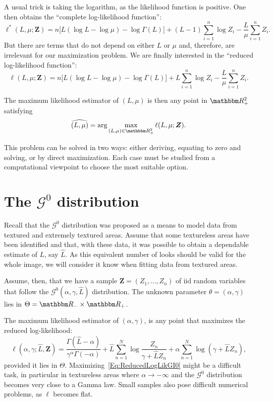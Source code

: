 A usual trick is taking the logarithm, as the likelihood function is positive.
One then obtains the ``complete log-likelihood function'':
\begin{equation}
\ell^*(L,\mu;\bm Z)=n\big[L(\log L - \log\mu) - \log\Gamma(L)
\big] + (L-1)\sum_{i=1}^n \log Z_i - \frac{L}{\mu} \sum_{i=1}^n Z_i.
\end{equation}
But there are terms that do not depend on either $L$ or $\mu$ and, therefore, are irrelevant for our maximization problem.
We are finally interested in the ``reduced log-likelihood function'':
\begin{equation}
\ell(L,\mu;\bm Z)=n\big[L(\log L - \log\mu) - \log\Gamma(L)
\big] + L\sum_{i=1}^n \log Z_i - \frac{L}{\mu} \sum_{i=1}^n Z_i.
\label{eq:RedLogLikGammaSAR}
\end{equation}

The maximum likelihood estimator of $(L,\mu)$ is then any point in $\mathbbm R_+^2$ satisfying
\begin{equation}
\widehat{(L,\mu)} = \arg\max_{(L,\mu)\in\mathbbm R_+^2} \ell(L,\mu;\bm Z).
\end{equation}

This problem can be solved in two ways: either deriving, equating to zero and solving, or by direct maximization.
Each case must be studied from a computational viewpoint to choose the most suitable option.

\section{The $\mathcal G^0$ distribution}

Recall that the $\mathcal G^0$ distribution was proposed as a means to model data from textured and extremely textured areas.
Assume that some textureless areas have been identified and that, with these data, it was possible to obtain a dependable estimate of $L$, say $\widehat L$.
As this equivalent number of looks should be valid for the whole image, we will consider it know when fitting data from textured areas.

Assume, then, that we have a sample $\bm Z = (Z_1,\dots,Z_n)$ of iid random variables that follow the $\mathcal G^0(\alpha,\gamma,\widehat L)$ distribution.
The unknown parameter $\theta=(\alpha,\gamma)$ lies in $\Theta=\mathbbm R_- \times \mathbbm R_+$.

The maximum likelihood estimator of $(\alpha,\gamma)$, is any point that maximizes the reduced log-likelihood:
\begin{equation}
\ell(\alpha,\gamma;\widehat L, \bm Z) = 
\frac{\Gamma(\widehat L-\alpha)}{\gamma^\alpha \Gamma(-\alpha)} +
\widehat L \sum_{n=1}^N \log\frac{Z_n}{\gamma+\widehat L Z_n} + 
\alpha \sum_{n=1}^N \log(\gamma + \widehat L Z_n),
\label{Eq:ReducedLogLikGI0}
\end{equation}
provided it lies in $\Theta$.
Maximizing~\eqref{Eq:ReducedLogLikGI0} might be a difficult task, in particular in textureless areas where $\alpha\to-\infty$ and the $\mathcal G^0$ distribution becomes very close to a Gamma law.
Small samples also pose difficult numerical problems, as $\ell$ becomes flat\cite{FreryCribariSouza:JASP:04}.

